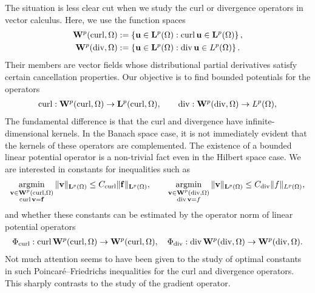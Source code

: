 \documentclass[a4paper]{article}
\begin{document}
The situation is less clear cut when we study the curl or divergence operators in vector calculus.
Here, we use the function spaces
\begin{align*}
    {\mathbf W}^{p}(\operatorname{curl},\Omega) &:= \left\{ {\mathbf u} \in {\mathbf L}^p(\Omega) : \operatorname{curl} {\mathbf u} \in {\mathbf L}^p(\Omega) \right\}
    ,
    \\
    {\mathbf W}^{p}(\operatorname{div},\Omega) &:= \left\{ {\mathbf u} \in {\mathbf L}^p(\Omega) : \operatorname{div} {\mathbf u} \in L^p(\Omega) \right\}
    .
\end{align*}
Their members are vector fields whose distributional partial derivatives satisfy certain cancellation properties. 
Our objective is to find bounded potentials for the operators 
\begin{align*}
    \operatorname{curl} : {\mathbf W}^{p}(\operatorname{curl},\Omega) \rightarrow {\mathbf L}^{p}(\operatorname{curl},\Omega),
    \qquad 
    \operatorname{div} : {\mathbf W}^{p}(\operatorname{div},\Omega) \rightarrow L^{p}(\Omega),
\end{align*}
The fundamental difference is that the curl and divergence have infinite-dimensional kernels. 
In the Banach space case, it is not immediately evident that the kernels of these operators are complemented.
The existence of a bounded linear potential operator is a non-trivial fact even in the Hilbert space case.
We are interested in constants for inequalities such as 
\begin{align*}
    \operatorname*{{\rm argmin}}\limits_{ \substack{ {\mathbf v} \in {\mathbf W}^{p}(\operatorname{curl},\Omega) \\ \operatorname{curl} {\mathbf v} = {\mathbf f} } } 
    \| {\mathbf v} \|_{{\mathbf L}^{p}(\Omega)}
    \leq 
    C_{\operatorname{curl}}
    \| {\mathbf f} \|_{{\mathbf L}^{p}(\Omega)}
    ,
    \qquad 
    \operatorname*{{\rm argmin}}\limits_{ \substack{ {\mathbf v} \in {\mathbf W}^{p}(\operatorname{div},\Omega) \\ \operatorname{div} {\mathbf v} = f } } 
    \| {\mathbf v} \|_{{\mathbf L}^{p}(\Omega)}
    \leq 
    C_{\operatorname{div}}
    \| f \|_{L^{p}(\Omega)}
    ,
\end{align*}
and whether these constants can be estimated by the operator norm of linear potential operators 
\begin{align*}
    \Phi_{\operatorname{curl}} : \operatorname{curl} {\mathbf W}^{p}(\operatorname{curl},\Omega) \rightarrow {\mathbf W}^{p}(\operatorname{curl},\Omega)
    ,
    \quad 
    \Phi_{\operatorname{div}} : \operatorname{div} {\mathbf W}^{p}(\operatorname{div},\Omega) \rightarrow {\mathbf W}^{p}(\operatorname{div},\Omega)
    .
\end{align*}
Not much attention seems to have been given to the study of optimal constants in such Poincar\'e--Friedrichs inequalities for the curl and divergence operators. 
This sharply contrasts to the study of the gradient operator. 
\end{document}
